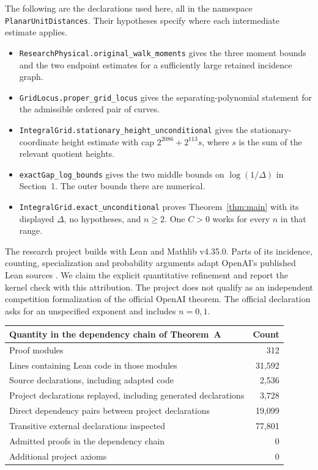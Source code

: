 \documentclass[11pt,letterpaper,oneside,reqno]{amsart}
\theoremstyle{definition}
\begin{document}
The following are the declarations used here, all in the namespace
\texttt{PlanarUnitDistances}. Their hypotheses specify where each
intermediate estimate applies.
\begin{itemize}
\item \texttt{ResearchPhysical.original\_walk\_moments} gives the three
moment bounds and the two endpoint estimates for a sufficiently large
retained incidence graph.
\item \texttt{GridLocus.proper\_grid\_locus} gives the separating-polynomial
statement for the admissible ordered pair of curves.
\item \texttt{IntegralGrid.stationary\_height\_unconditional} gives the
stationary-coordinate height estimate with cap \(2^{2086}+2^{113}s\),
where \(s\) is the sum of the relevant quotient heights.
\item \texttt{exactGap\_log\_bounds} gives the two middle bounds on
\(\log(1/\Delta)\) in Section~1. The outer bounds there are numerical.
\item \texttt{IntegralGrid.exact\_unconditional} proves
Theorem~\ref{thm:main} with its displayed \(\Delta\), no hypotheses,
and \(n\ge2\). One \(C>0\) works for every \(n\) in that range.
\end{itemize}

The research project builds with Lean and Mathlib v4.35.0. Parts of its
incidence, counting, specialization and probability arguments adapt
OpenAI's published Lean sources \cite{OAI2}. We claim the explicit
quantitative refinement and report the kernel check with this attribution.
The project does not qualify as an independent competition formalization
of the official OpenAI theorem. The official declaration asks for
an unspecified exponent and includes \(n=0,1\).

\begin{center}
\begin{tabular}{@{}lr@{}}
\toprule
Quantity in the dependency chain of Theorem~A & Count\\
\midrule
Proof modules & 312\\
Lines containing Lean code in those modules & 31,592\\
Source declarations, including adapted code & 2,536\\
Project declarations replayed, including generated declarations & 3,728\\
Direct dependency pairs between project declarations & 19,099\\
Transitive external declarations inspected & 77,801\\
Admitted proofs in the dependency chain & 0\\
Additional project axioms & 0\\
\bottomrule
\end{tabular}
\end{center}
\end{document}
